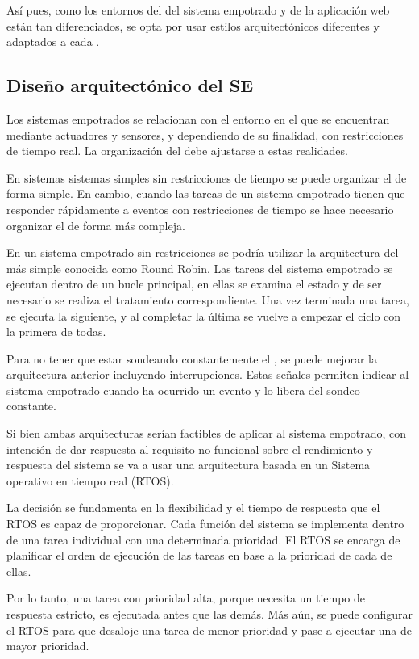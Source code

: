 Así pues, como los entornos del \sw{} del sistema empotrado y de la aplicación
web están tan diferenciados, se opta por usar estilos arquitectónicos diferentes
y adaptados a cada \sw{}.

\subsection{Diseño arquitectónico del SE} \label{sec:arch-se}
Los sistemas empotrados se relacionan con el entorno en el que se encuentran
mediante actuadores y sensores, y dependiendo de su finalidad, con
restricciones de tiempo real. La organización del \sw{} debe ajustarse a estas
realidades.

En sistemas sistemas simples sin restricciones de tiempo se puede organizar
el \sw{} de forma simple. En cambio, cuando las tareas de un sistema empotrado
tienen que responder rápidamente a eventos con restricciones de tiempo se hace
necesario organizar el \sw{} de forma más compleja.

En un sistema empotrado sin restricciones se podría utilizar la arquitectura
del \sw{} más simple conocida como Round Robin. Las tareas del sistema empotrado
se ejecutan dentro de un bucle principal, en ellas se examina el estado \hw{} y
de ser necesario se realiza el tratamiento correspondiente. Una vez terminada
una tarea, se ejecuta la siguiente, y al completar la última se vuelve a empezar
el ciclo con la primera de todas.


Para no tener que estar sondeando constantemente el \hw{}, se puede mejorar la 
arquitectura anterior incluyendo interrupciones. Estas señales permiten indicar
al sistema empotrado cuando ha ocurrido un evento y lo libera del sondeo
constante.

Si bien ambas arquitecturas serían factibles de aplicar al sistema empotrado,
con intención de dar respuesta al requisito no funcional sobre el rendimiento
y respuesta del sistema se va a usar una arquitectura basada en un Sistema
operativo en tiempo real (RTOS).

La decisión se fundamenta en la flexibilidad y el tiempo de respuesta que el
RTOS es capaz de proporcionar. Cada función del sistema se implementa dentro de
una tarea individual con una determinada prioridad. El RTOS se encarga de 
planificar el orden de ejecución de las tareas en base a la prioridad de cada
de ellas. 

Por lo tanto, una tarea con prioridad alta, porque necesita un tiempo
de respuesta estricto, es ejecutada antes que las demás. Más aún, se puede
configurar el RTOS para que desaloje una tarea de menor prioridad y pase a
ejecutar una de mayor prioridad.


